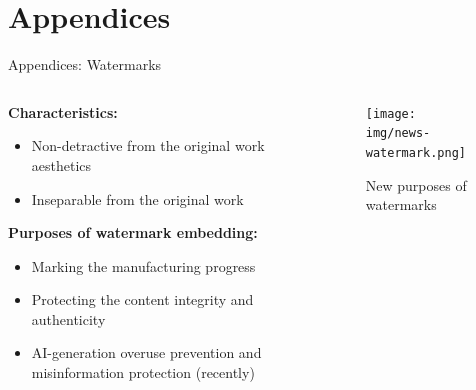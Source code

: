\section*{Appendices}
\begin{frame}{Appendices: Watermarks}
\begin{columns}[c]
\begin{column}{0.48\textwidth}
\textbf{Characteristics:}
    \vfill
    \begin{itemize}
        \item Non-detractive from the original work aesthetics
        \item Inseparable from the original work
    \end{itemize}
\textbf{Purposes of watermark embedding:}
    \vfill
    \begin{itemize}
        \item Marking the manufacturing progress
        \item Protecting the content integrity and authenticity
        \item AI-generation overuse prevention and misinformation protection (recently)
    \end{itemize}
\end{column}

\begin{column}{0.48\textwidth}
\begin{figure}
        \centering      \texttt{[image: img/news-watermark.png]}
        \caption{New purposes of watermarks}
    \end{figure} 
\end{column}
\end{columns}
\end{frame}


